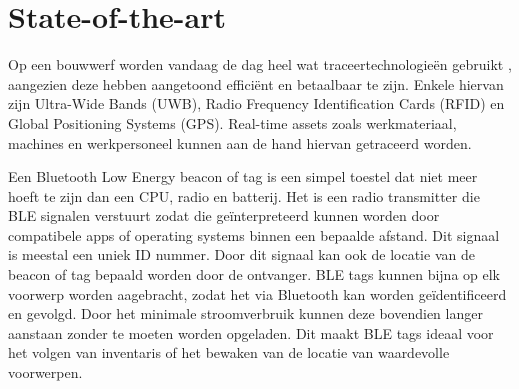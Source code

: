 %
%
%
%


\section{State-of-the-art}%
\label{sec:state-of-the-art}

Op een bouwwerf worden vandaag de dag heel wat traceertechnologieën gebruikt \autocite{Nasr2013}, aangezien deze hebben aangetoond efficiënt en betaalbaar te zijn. Enkele hiervan zijn Ultra-Wide Bands (UWB), Radio Frequency Identification Cards (RFID) en Global Positioning Systems (GPS). Real-time assets zoals werkmateriaal, machines en werkpersoneel kunnen aan de hand hiervan getraceerd worden. 

Een Bluetooth Low Energy  beacon of tag is een simpel toestel dat niet meer hoeft te zijn dan een CPU, radio en batterij. Het is een radio transmitter \autocite{Andony2022} die BLE signalen verstuurt zodat die geïnterpreteerd kunnen worden door compatibele apps of operating systems binnen een bepaalde afstand. Dit signaal is meestal een uniek ID nummer. Door dit signaal kan ook de locatie van de beacon of tag bepaald worden door de ontvanger. BLE tags kunnen bijna op elk voorwerp worden aagebracht, zodat het via Bluetooth kan worden geïdentificeerd en gevolgd. Door het minimale stroomverbruik kunnen deze bovendien langer aanstaan zonder te moeten worden opgeladen. Dit maakt BLE tags ideaal voor het volgen van inventaris of het bewaken van de locatie van waardevolle voorwerpen.


